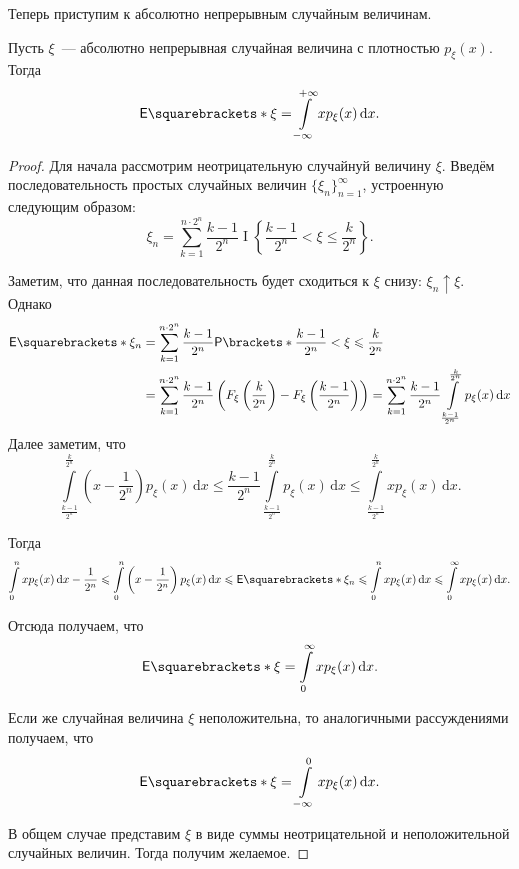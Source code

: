 Теперь приступим к абсолютно непрерывным случайным величинам.
\begin{theorem}
	Пусть \(\xi\)~--- абсолютно непрерывная случайная величина с плотностью \(p_{\xi}(x)\). Тогда
	\[
	\E{\xi} = \int\limits_{-\infty}^{+\infty} xp_{\xi}(x)\,\mathrm{d}x.
	\]
\end{theorem}
\begin{proof}
	Для начала рассмотрим неотрицательную случайнуй величину \(\xi\). Введём последовательность простых случайных величин \(\{\xi_n\}_{n = 1}^{\infty}\), устроенную следующим образом:
	\[
	\xi_n = \sum\limits_{k = 1}^{n \cdot 2^n} \frac{k - 1}{2^n}\mathop{I}\left\{\frac{k - 1}{2^n} < \xi \leq \frac{k}{2^n}\right\}.
	\]
	
	Заметим, что данная последовательность будет сходиться к \(\xi\) снизу: \(\xi_n \uparrow \xi\). Однако
	\begin{align}
		\E{\xi_n} &= \sum\limits_{k = 1}^{n \cdot 2^n} \frac{k - 1}{2^n}\Pr{\frac{k - 1}{2^n} < \xi \leq \frac{k}{2^n}} \\
		&= \sum\limits_{k = 1}^{n \cdot 2^n} \frac{k - 1}{2^n}\left(F_{\xi}\left(\frac{k}{2^n}\right) - F_{\xi}\left(\frac{k - 1}{2^n}\right)\right) = \sum\limits_{k = 1}^{n \cdot 2^n} \frac{k - 1}{2^n}\int\limits_{\frac{k - 1}{2^n}}^{\frac{k}{2^n}} p_{\xi}(x)\,\mathrm{d}x
	\end{align}
	Далее заметим, что
	\[
	\int\limits_{\frac{k - 1}{2^n}}^{\frac{k}{2^n}} \left(x - \frac{1}{2^n}\right) p_{\xi}(x)\,\mathrm{d}x \leq \frac{k - 1}{2^n}\int\limits_{\frac{k - 1}{2^n}}^{\frac{k}{2^n}} p_{\xi}(x)\,\mathrm{d}x \leq \int\limits_{\frac{k - 1}{2^n}}^{\frac{k}{2^n}} xp_{\xi}(x)\,\mathrm{d}x.
	\]
	
	Тогда
	\[
	\int\limits_{0}^{n} xp_{\xi}(x)\,\mathrm{d}x - \frac{1}{2^n} \leq \int\limits_{0}^{n} \left(x - \frac{1}{2^n}\right) p_{\xi}(x)\,\mathrm{d}x \leq \E{\xi_n} \leq \int\limits_{0}^{n} xp_{\xi}(x)\,\mathrm{d}x \leq \int\limits_{0}^{\infty} xp_{\xi}(x)\,\mathrm{d}x.
	\]
	
	Отсюда получаем, что 
	\[
	\E{\xi} = \int\limits_{0}^{\infty} xp_{\xi}(x)\,\mathrm{d}x.
	\]
	
	Если же случайная величина \(\xi\) неположительна, то аналогичными рассуждениями получаем, что
	\[
	\E{\xi} = \int\limits_{-\infty}^{0} xp_{\xi}(x)\,\mathrm{d}x.
	\]
	
	В общем случае представим \(\xi\) в виде суммы неотрицательной и неположительной случайных величин. Тогда получим желаемое.
\end{proof}


